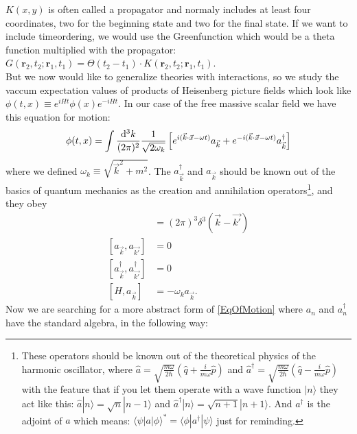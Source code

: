 	$K(x,y)$ is often called a propagator and normaly includes at least four coordinates, two for the beginning state and two for the final state. If we want to include timeordering, we would use the Greenfunction which would be a theta function multiplied with the propagator: $G(\textbf{r}_2,t_2;\textbf{r}_1,t_1)=\Theta(t_2-t_1)\cdot K(\textbf{r}_2,t_2;\textbf{r}_1,t_1)$.\\
	
	But we now would like to generalize theories with interactions, so we study the vaccum expectation values of products of Heisenberg picture fields which look like $\phi(t,x) \equiv e^{iHt} \phi(x) e^{-iHt}$. In our case of the free massive scalar field we have this equation for motion:
		\begin{equation}  \label{EqOfMotion}
			\phi(t,x) = \int \frac{\mathrm{d}^3 k}{(2\pi)^2} \frac{1}{\sqrt{2\omega_k}} 
			\left[ e^{i(\vec{k}\cdot\vec{x}-\omega t)} a_{\vec{k}} +
			e^{-i(\vec{k}\cdot\vec{x}-\omega t)} a^{\dagger}_{\vec{k}}
			\right]
		\end{equation}
	where we defined $\omega_k \equiv \sqrt{\vec{k}^2+m^2}$. The $a^{\dagger}_{\vec{k}}$ and $a_{\vec{k}}$ should be known out of the basics of quantum mechanics as the creation and annihilation operators\footnote{These operators should be known out of the theoretical physics of the harmonic oscillator, where $\hat{a}= \sqrt{\frac{m\omega}{2\hbar}} 
		\left(\hat{q} + \frac{i}{m\omega}\hat{p}
		\right)
		$ and 
		$ \hat{a}^{\dagger}= \sqrt{\frac{m\omega}{2\hbar}} 
		\left(\hat{q} - \frac{i}{m\omega}\hat{p}
		\right)
		$
	with the feature that if you let them operate with a wave function $|n\rangle$ they act like this:
	$\hat{a}|n\rangle = \sqrt{n}|n-1\rangle$ and $\hat{a}^{\dagger}|n\rangle= \sqrt{n+1}|n+1\rangle$.
	And $a^{\dagger}$ is the adjoint of $a$ which means: $\langle \psi | a | \phi \rangle^*= \langle \phi | a^{\dagger} | \psi \rangle$ just for reminding.
	}, and they obey
		\begin{align*}
			[a_{\vec{k}},a^{\dagger}_{\vec{k'}}]&= (2\pi)^3 \delta^3 (\vec{k}-\vec{k'})\\
			[a_{\vec{k}},a_{\vec{k'}}]&=0 \\
			[a^{\dagger}_{\vec{k}},a^{\dagger}_{\vec{k'}}]&=0 \\
			[H,a_{\vec{k}}]&=-\omega_k a_{\vec{k}}.
		\end{align*}
	Now we are searching for a more abstract form of \eqref{EqOfMotion} where $a_n$ and $a^{\dagger}_n$ have the standard algebra, in the following way:

